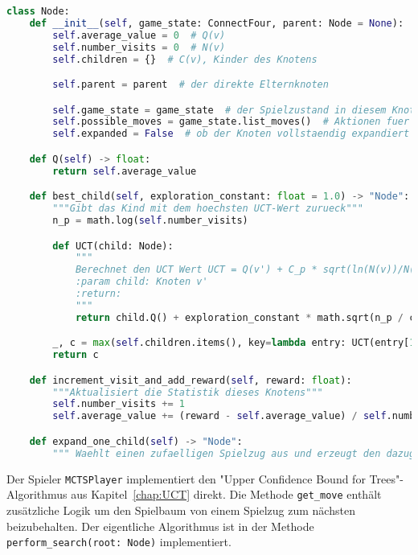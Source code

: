 \begin{lstlisting}[language=Python,caption=Der Knoten der Monte-Carlo-Baumsuche,label={lst:mcts-node}]
class Node:
    def __init__(self, game_state: ConnectFour, parent: Node = None):
        self.average_value = 0  # Q(v)
        self.number_visits = 0  # N(v)
        self.children = {}  # C(v), Kinder des Knotens

        self.parent = parent  # der direkte Elternknoten

        self.game_state = game_state  # der Spielzustand in diesem Knoten
        self.possible_moves = game_state.list_moves()  # Aktionen fuer die noch nicht erforschten Kindknoten
        self.expanded = False  # ob der Knoten vollstaendig expandiert ist

    def Q(self) -> float:
        return self.average_value

    def best_child(self, exploration_constant: float = 1.0) -> "Node":
        """Gibt das Kind mit dem hoechsten UCT-Wert zurueck"""
        n_p = math.log(self.number_visits)

        def UCT(child: Node):
            """
            Berechnet den UCT Wert UCT = Q(v') + C_p * sqrt(ln(N(v))/N(v'))
            :param child: Knoten v'
            :return:
            """
            return child.Q() + exploration_constant * math.sqrt(n_p / child.number_visits)

        _, c = max(self.children.items(), key=lambda entry: UCT(entry[1]))
        return c

    def increment_visit_and_add_reward(self, reward: float):
        """Aktualisiert die Statistik dieses Knotens"""
        self.number_visits += 1
        self.average_value += (reward - self.average_value) / self.number_visits

    def expand_one_child(self) -> "Node":
        """ Waehlt einen zufaelligen Spielzug aus und erzeugt den dazugehoerigen Kindknoten"""

\end{lstlisting}

Der Spieler \verb|MCTSPlayer| implementiert den "Upper Confidence Bound for Trees"-Algorithmus aus Kapitel~\ref{chap:UCT} direkt.
Die Methode \verb|get_move| enthält zusätzliche Logik um den Spielbaum von einem Spielzug zum nächsten beizubehalten.
Der eigentliche Algorithmus ist in der Methode \verb|perform_search(root: Node)| implementiert.

